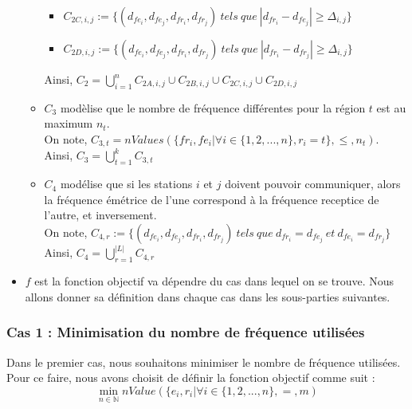 \documentclass[a4paper, 10pt]{article}
\begin{document}
\begin{itemize}
\begin{itemize}
\begin{itemize}
                        \item $C_{2C,i,j} := \{(d_{fe_i},d_{fe_j},d_{fr_i},d_{fr_j}) ~tels~que~| d_{fr_i} - d_{fe_j} | \geq \Delta_{i,j} \}$
                        \item $C_{2D,i,j} := \{(d_{fe_i},d_{fe_j},d_{fr_i},d_{fr_j}) ~tels~que~ | d_{fr_i} - d_{fr_j} | \geq \Delta_{i,j} \}$
                      \end{itemize}
                      Ainsi, $\displaystyle{C_2 = \bigcup_{i=1}^{n} C_{2A,i,j} \cup C_{2B,i,j} \cup C_{2C,i,j}  \cup C_{2D,i,j}}$
                \item $C_3$ modèlise que le nombre de fréquence différentes pour la région $t$ est au maximum $n_t$. \\
                      On note, $C_{3,t} = nValues(\{fr_{i}, fe_{i} | \forall i \in \{1,2,...,n \}, r_{i} = t \}, \leq, n_{t})$. \\
                      Ainsi, $\displaystyle{C_3 = \bigcup_{t=1}^{k} C_{3,t}}$
                \item $C_4$ modélise que si les stations $i$ et $j$ doivent pouvoir communiquer, alors la fréquence émétrice de l'une correspond à la fréquence receptice de l'autre, et inversement. \\
                On note, $\displaystyle{ C_{4,r} := \{ (d_{fe_i},d_{fe_j},d_{fr_i},d_{fr_j})~tels~que~d_{fr_i} = d_{fe_j}~et~d_{fe_i} = d_{fr_j} \} }$ \\
                Ainsi, $\displaystyle{C_4 = \bigcup_{r=1}^{|L|} C_{4,r}}$

              \end{itemize}

          \item $f$ est la fonction objectif va dépendre du cas dans lequel on se trouve. Nous allons donner sa définition dans chaque cas dans les sous-parties suivantes.
      \end{itemize}



      \subsubsection{Cas 1 : Minimisation du nombre de fréquence utilisées}

        Dans le premier cas, nous souhaitons minimiser le nombre de fréquence utilisées. Pour ce faire, nous avons choisit de définir la fonction objectif comme suit :
        $$ \displaystyle{ \min_{n \in \mathbb{N}}  nValue(\{ e_{i}, r_{i} | \forall i \in \{1,2,...,n \}, =, m) }$$
\end{document}
